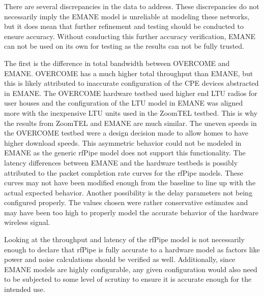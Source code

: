 There are several discrepancies in the data to address.
These discrepancies do not necessarily imply the EMANE model is unreliable at modeling these networks, but it does mean that further refinement and testing should be conducted to ensure accuracy.
Without conducting this further accuracy verification, EMANE can not be used on its own for testing as the results can not be fully trusted.\par
The first is the difference in total bandwidth between OVERCOME and EMANE.
OVERCOME has a much higher total throughput than EMANE, but this is likely attributed to inaccurate configuration of the CPE devices abstracted in EMANE.
The OVERCOME hardware testbed used higher end LTU radios for user houses and the configuration of the LTU model in EMANE was aligned more with the inexpensive LTU units used in the ZoomTEL testbed.
This is why the results from ZoomTEL and EMANE are much similar.
The uneven speeds in the OVERCOME testbed were a design decision made to allow homes to have higher download speeds.
This asymmetric behavior could not be modeled in EMANE as the generic rfPipe model does not support this functionality.
The latency differences between EMANE and the hardware testbeds is possibly attributed to the packet completion rate curves for the rfPipe models.
These curves may not have been modified enough from the baseline to line up with the actual expected behavior.
Another possibility is the delay parameters not being configured properly.
The values chosen were rather conservative estimates and may have been too high to properly model the accurate behavior of the hardware wireless signal.\par
Looking at the throughput and latency of the rfPipe model is not necessarily enough to declare that rfPipe is fully accurate to a hardware model as factors like power and noise calculations should be verified as well.
Additionally, since EMANE models are highly configurable, any given configuration would also need to be subjected to some level of scrutiny to ensure it is accurate enough for the intended use.

